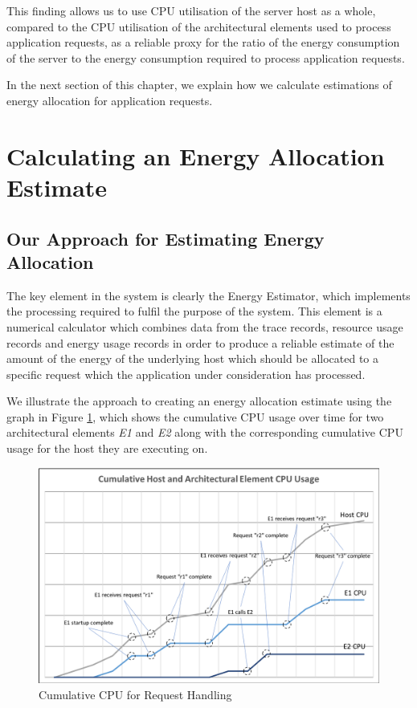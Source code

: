 This finding allows us to use CPU utilisation of the server host as a whole, compared to the CPU utilisation of the architectural elements used to process application requests, as a reliable proxy for the ratio of the energy consumption of the server to the energy consumption required to process application requests.

In the next section of this chapter, we explain how we calculate estimations of energy allocation for application requests.

\section{Calculating an Energy Allocation Estimate}

\subsection{Our Approach for Estimating Energy Allocation}
The key element in the system is clearly the Energy Estimator, which implements the processing required to fulfil the purpose of the system.  This element is a numerical calculator which combines data from the trace records, resource usage records and energy usage records in order to produce a reliable estimate of the amount of the energy of the underlying host which should be allocated to a specific request which the application under consideration has processed.

We illustrate the approach to creating an energy allocation estimate using the graph in Figure \ref{figure:cpuusage}, which shows the cumulative CPU usage over time for two architectural elements \emph{E1} and \emph{E2} along with the corresponding cumulative CPU usage for the host they are executing on.

\begin{figure}
\centering
\includegraphics[width=1.0\textwidth]{Figures/estimating-energy-cpuusage}
\caption{Cumulative CPU for Request Handling}
\label{figure:cpuusage}
\end{figure}

